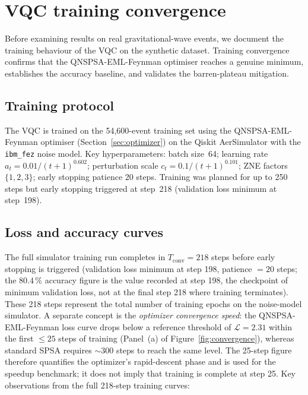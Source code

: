 \documentclass[11pt,a4paper, english]{book}
\theoremstyle{plain}
\theoremstyle{definition}
\numberwithin{equation}{chapter}
\numberwithin{figure}{chapter}
\numberwithin{table}{chapter}
\begin{document}
\section{VQC training convergence}
\label{sec:training-results}

Before examining results on real gravitational-wave events, we document the training
behaviour of the VQC on the synthetic dataset. Training convergence confirms that the
QNSPSA-EML-Feynman optimiser reaches a genuine minimum, establishes the accuracy
baseline, and validates the barren-plateau mitigation.

\subsection{Training protocol}
\label{subsec:training-protocol}

The VQC is trained on the 54{,}600-event training set using the
QNSPSA-EML-Feynman optimiser (Section~\ref{sec:optimizer}) on the Qiskit
AerSimulator with the \texttt{ibm\_fez} noise model. Key hyperparameters:
batch size~64; learning rate $a_t = 0.01/(t+1)^{0.602}$; perturbation scale
$c_t = 0.1/(t+1)^{0.101}$; ZNE factors $\{1,2,3\}$; early stopping patience
20 steps. Training was planned for up to 250 steps but early stopping triggered
at step~218 (validation loss minimum at step~198).

\subsection{Loss and accuracy curves}
\label{subsec:loss-curves}

The full simulator training run completes in $T_\mathrm{conv} = 218$ steps
before early stopping is triggered (validation loss minimum at step 198,
patience $= 20$ steps; the $80.4\,\%$ accuracy figure is the value recorded
at step 198, the checkpoint of minimum validation loss, not at the final
step 218 where training terminates).  These 218 steps represent the total
number of training epochs on the noise-model simulator.  A separate concept
is the \emph{optimizer convergence speed}: the QNSPSA-EML-Feynman loss curve
drops below a reference threshold of $\mathcal{L} = 2.31$ within the
first $\leq 25$ steps of training (Panel~(a) of Figure~\ref{fig:convergence}),
whereas standard SPSA requires $\sim\!300$ steps to reach the same level.
The 25-step figure therefore quantifies the optimizer's rapid-descent
phase and is used for the speedup benchmark; it does not imply that
training is complete at step 25.  Key observations from the full
218-step training curves:
\end{document}
